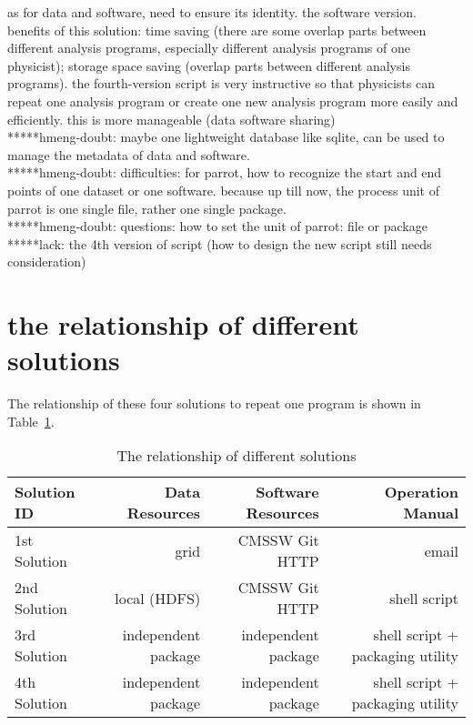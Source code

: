 \documentclass{article}
\begin{document}
as for data and software, need to ensure its identity. the software version.\\

benefits of this solution: time saving (there are some overlap parts between different analysis programs, especially different analysis programs of one physicist); storage space saving (overlap parts between different analysis programs). the fourth-version script is very instructive so that physicists can repeat one analysis program or create one new analysis program more easily and efficiently.  this is more manageable (data software sharing)\\

*****hmeng-doubt: maybe one lightweight database like sqlite, can be used to manage the metadata of data and software. \\

*****hmeng-doubt: difficulties: for parrot, how to recognize the start and end points of one dataset or one software. because up till now, the process unit of parrot is one single file, rather one single package.\\

*****hmeng-doubt: questions: how to set the unit of parrot: file or package\\

*****lack: the 4th version of script (how to design the new script still needs consideration)

\section{the relationship of different solutions}
\indent The relationship of these four solutions to repeat one program is shown in Table~\ref{table:relationship}.\\

\begin{table}
    \centering
    \begin{tabular}{|l|r|r|r|}
        \hline
        Solution ID & Data Resources & Software Resources & Operation Manual \\ \hline
        1st Solution & grid & CMSSW Git HTTP & email \\ \hline
        2nd Solution & local (HDFS) & CMSSW Git HTTP & shell script \\ \hline
        3rd Solution & independent package & independent package & shell script + packaging utility \\ \hline
        4th Solution & independent package & independent package & shell script + packaging utility \\ \hline
    \end{tabular}
    \caption{The relationship of different solutions}
    \label{table:relationship}
\end{table}
\end{document}
